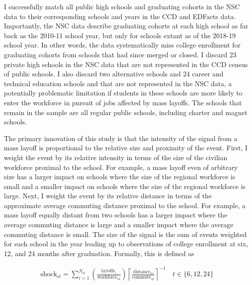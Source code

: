 \documentclass[12pt,letterpaper]{article}
\begin{document}
I successfully match all public high schools and graduating cohorts in the NSC data to their corresponding schools and years in the CCD and EDFacts data. Importantly, the NSC data describe graduating cohorts at each high school as far back as the 2010-11 school year, but only for schools extant as of the 2018-19 school year. In other words, the data systematically miss college enrollment for graduating cohorts from schools that had since merged or closed. I discard 23 private high schools in the NSC data that are not represented in the CCD census of public schools. I also discard two alternative schools and 24 career and technical education schools and that are not represented in the NSC data, a potentially problematic limitation if students in these schools are more likely to enter the workforce in pursuit of jobs affected by mass layoffs. The schools that remain in the sample are all regular public schools, including charter and magnet schools.

The primary innovation of this study is that the intensity of the signal from a mass layoff is proportional to the relative size and proximity of the event. First, I weight the event by its relative intensity in terms of the size of the civilian workforce proximal to the school. For example, a mass layoff even of arbitrary size has a larger impact on schools where the size of the regional workforce is small and a smaller impact on schools where the size of the regional workforce is large. Next, I weight the event by its relative distance in terms of the approximate average commuting distance proximal to the school. For example, a mass layoff equally distant from two schools has a larger impact where the average commuting distance is large and a smaller impact where the average commuting distance is small. The size of the signal is the sum of events weighted for each school in the year leading up to observations of college enrollment at six, 12, and 24 months after graduation. Formally, this is defined as

\begin{align}
  \text{shock}_{ct} = \sum_{i=1}^{N_{ct}}\left(\frac{\text{layoffs}_{i}}{\text{workforce}_{st}}\right)\left\lceil\frac{\text{distance}_{is}}{\text{commute}_{st}}\right\rceil^{-1} \quad t \in \{6, 12, 24\}
\end{align}
\end{document}
